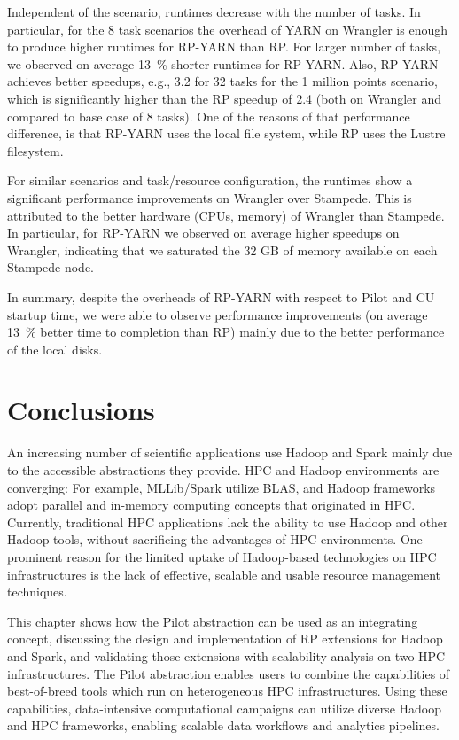 Independent of the scenario, runtimes decrease with the number of tasks. In
particular, for the 8 task scenarios the overhead of YARN on Wrangler is 
enough to produce higher runtimes for RP-YARN than RP.
For larger number of
tasks, we observed on average 13~\% shorter runtimes for RP-YARN.
Also, RP-YARN achieves better speedups, e.g., 3.2 for 32 tasks for
the 1 million points scenario, which is significantly higher than the
RP speedup of 2.4 (both on Wrangler and compared to base case of 8
tasks). One of the reasons of that performance difference, is that
RP-YARN uses the local file system, while RP uses the
Lustre filesystem.

For similar scenarios and task/resource configuration, the runtimes show a
significant performance improvements on Wrangler over Stampede. This is
attributed to the better hardware (CPUs, memory) of Wrangler than Stampede. In
particular, for RP-YARN we observed on average higher speedups on
Wrangler, indicating that we saturated the 32 GB of memory available on each
Stampede node.

In summary, despite the overheads of RP-YARN with respect to Pilot
and CU startup time, we were able to observe performance improvements
(on average 13~\% better time to completion than RP) mainly due to
the better performance of the local disks.


\section{Conclusions}
\label{sec:hpc_hadoop_concl}

An increasing number of scientific applications use Hadoop and Spark mainly due
to the accessible abstractions they provide. HPC and Hadoop environments are
converging: For example, MLLib/Spark utilize BLAS, and Hadoop frameworks adopt
parallel and in-memory computing concepts that originated in HPC. Currently,
traditional HPC applications lack the ability to use Hadoop and other Hadoop
tools, without sacrificing the advantages of HPC environments. One prominent
reason for the limited uptake of Hadoop-based technologies on HPC
infrastructures is the lack of effective, scalable and usable resource
management techniques.

This chapter shows how the Pilot abstraction can be used as an integrating
concept, discussing the design and implementation of RP extensions
for Hadoop and Spark, and validating those extensions with scalability analysis
on two HPC infrastructures. The Pilot abstraction enables users to combine the
capabilities of best-of-breed tools which run on heterogeneous HPC
infrastructures. Using these capabilities, data-intensive computational
campaigns can utilize diverse Hadoop and HPC frameworks, enabling
scalable data workflows and analytics pipelines.

